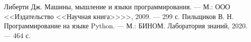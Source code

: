 \begin{thebibliography}{}
     Либерти Дж. Машины, мышление и языки программирования. — М.: ООО <<Издательство <<Научная книга>>>>, 2009. — 299 с.
     Пильщиков В. Н. Программирование на языке Python. — М.: БИНОМ. Лаборатория знаний, 2020. — 464 с.
\end{thebibliography}
